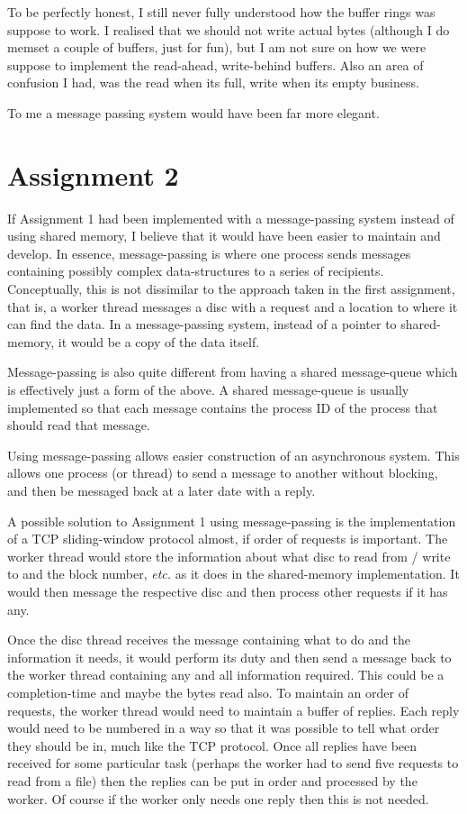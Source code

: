 \documentclass[12pt]{article}
\begin{document}
To be perfectly honest, I still never fully understood how the buffer rings was suppose to work. I realised that we should not write actual bytes (although I do memset a couple of buffers, just for fun), but I am not sure on how we were suppose to implement the read-ahead, write-behind buffers. Also an area of confusion I had, was the read when its full, write when its empty business.

To me a message passing system would have been far more elegant.

\section*{Assignment 2}

If Assignment 1 had been implemented with a message-passing system instead of using shared memory, I believe that it would have been easier to maintain and develop. In essence, message-passing is where one process sends messages containing possibly complex data-structures to a series of recipients. Conceptually, this is not dissimilar to the approach taken in the first assignment, that is, a worker thread messages a disc with a request and a location to where it can find the data. In a message-passing system, instead of a pointer to shared-memory, it would be a copy of the data itself.

Message-passing is also quite different from having a shared message-queue which is effectively just a form of the above. A shared message-queue is usually implemented so that each message contains the process ID of the process that should read that message.

Using message-passing allows easier construction of an asynchronous system. This allows one process (or thread) to send a message to another without blocking, and then be messaged back at a later date with a reply. 

A possible solution to Assignment 1 using message-passing is the implementation of a TCP sliding-window protocol almost, if order of requests is important. The worker thread would store the information about what disc to read from / write to and the block number, \emph{etc.} as it does in the shared-memory implementation. It would then message the respective disc and then process other requests if it has any. 

Once the disc thread receives the message containing what to do and the information it needs, it would perform its duty and then send a message back to the worker thread containing any and all information required. This could be a completion-time and maybe the bytes read also. To maintain an order of requests, the worker thread would need to maintain a buffer of replies. Each reply would need to be numbered in a way so that it was possible to tell what order they should be in, much like the TCP protocol. Once all replies have been received for some particular task (perhaps the worker had to send five requests to read from a file) then the replies can be put in order and processed by the worker. Of course if the worker only needs one reply then this is not needed. 
\end{document}
